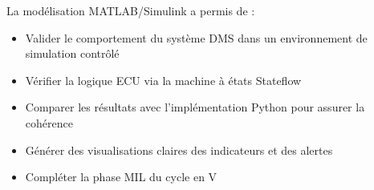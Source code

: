 La modélisation MATLAB/Simulink a permis de :
\begin{itemize}
    \item Valider le comportement du système DMS dans un environnement de simulation contrôlé
    \item Vérifier la logique ECU via la machine à états Stateflow
    \item Comparer les résultats avec l'implémentation Python pour assurer la cohérence
    \item Générer des visualisations claires des indicateurs et des alertes
    \item Compléter la phase MIL du cycle en V
\end{itemize}
